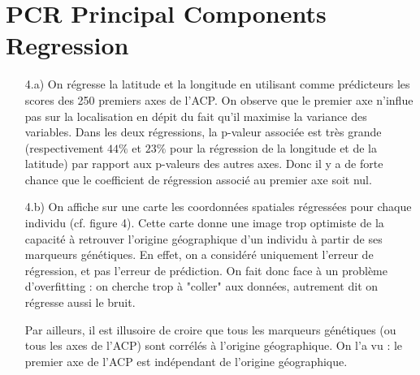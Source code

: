 \documentclass[a4paper, 12pt]{article}
\begin{document}
\section{PCR Principal Components Regression}

\begin{enumerate}
\setlength{\itemsep}{12pt}

\item[4.a)]
On régresse la latitude et la longitude en utilisant comme prédicteurs les scores des 250 premiers axes de l'ACP. On observe que le premier axe n'influe pas sur la localisation en dépit du fait qu'il maximise la variance des variables. Dans les deux régressions, la p-valeur associée est très grande (respectivement $44\%$ et $23\%$ pour la régression de la longitude et de la latitude) par rapport aux p-valeurs des autres axes. Donc il y a de forte chance que le coefficient de régression associé au premier axe soit nul. 

\item[4.b)]
On affiche sur une carte les coordonnées spatiales régressées pour chaque individu (cf. figure 4). Cette carte donne une image trop optimiste de la capacité à retrouver l'origine géographique d'un individu à partir de ses marqueurs génétiques. En effet, on a considéré uniquement l'erreur de régression, et pas l'erreur de prédiction. On fait donc face à un problème d'overfitting : on cherche trop à "coller" aux données, autrement dit on régresse aussi le bruit.

Par ailleurs, il est illusoire de croire que tous les marqueurs génétiques (ou tous les axes de l'ACP) sont corrélés à l'origine géographique. On l'a vu : le premier axe de l'ACP est indépendant de l'origine géographique.



\end{enumerate}
\end{document}
